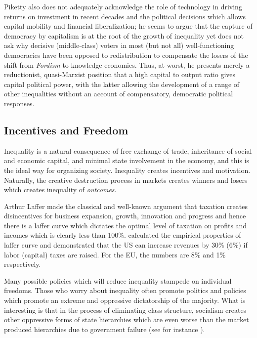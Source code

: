 \documentclass[12pt]{article}
\newcommand{\1}{\mathbbm 1}
\begin{document}
		Piketty also does not adequately acknowledge the role of technology in driving returns on investment in recent decades and the political decisions which allows capital mobility and financial liberalization; he seems to argue that the capture of democracy by capitalism is at the root of the growth of inequality yet does not ask why decisive (middle-class) voters in most (but not all) well-functioning democracies have been opposed to redistribution to compensate the losers of the shift from \textit{Fordism} to knowledge economies. Thus, at worst, he presents merely a reductionist, quasi-Marxist position that a high capital to output ratio gives capital political power, with the latter allowing the development of a range of other inequalities without an account of compensatory, democratic political responses.
		
		
		
		
		
		
		
		
		
		
		
		
	
		
		\subsection{Incentives and Freedom}
		
		Inequality is a natural consequence of free exchange of trade, inheritance of social and economic capital, and minimal state involvement in the economy, and this is the ideal way for organizing society. Inequality creates incentives and motivation. Naturally, the creative destruction process in markets creates winners and losers which creates inequality of \textit{outcomes}.
		
		
		Arthur Laffer made the classical and well-known argument that taxation creates disincentives for business expansion, growth, innovation and progress \cite{laffer2004laffer} and hence there is a laffer curve which dictates the optimal level of taxation on profits and incomes which is clearly less than 100\%. \cite{trabandt2011laffer} calculated the empirical properties of laffer curve and demonstrated that the US can increase revenues by 30\% (6\%) if labor (capital) taxes are raised. For the EU, the numbers are 8\% and 1\% respectively. 

		
		Many possible policies which will reduce inequality stampede on individual freedoms. Those who worry about inequality often promote politics and policies which promote an extreme and oppressive dictatorship of the majority. What is interesting is that in the process of eliminating class structure, socialism creates other oppressive forms of state hierarchies which are even worse than the market produced hierarchies due to government failure (see for instance \cite{le1991theory}).
		
\end{document}

